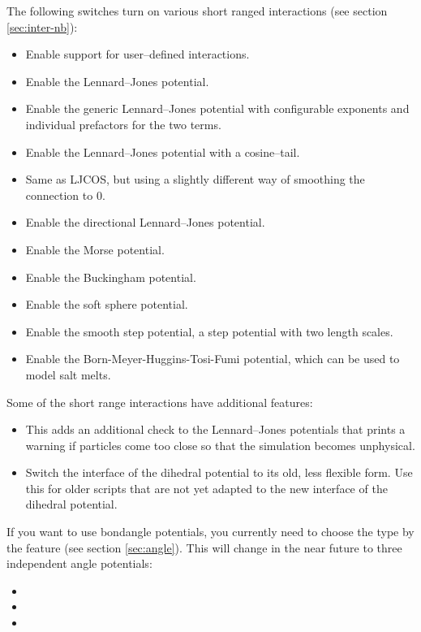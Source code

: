 The following switches turn on various short ranged interactions (see section
\vref{sec:inter-nb}):
\begin{itemize}
\item {} Enable support for user--defined
  interactions.
\item {} Enable the Lennard--Jones potential.
\item {} Enable the generic
  Lennard--Jones potential with configurable exponents and individual
  prefactors for the two terms.
\item {} Enable the Lennard--Jones potential with a cosine--tail.
\item {} Same as LJCOS, but using a slightly different way of
  smoothing the connection to 0.
\item {} Enable the directional Lennard--Jones potential.
\item {} Enable the Morse potential.
\item {} Enable the Buckingham potential.
\item {} Enable the soft sphere potential.
\item {} Enable the smooth step potential, a
  step potential with two length scales.
\item {} Enable the Born-Meyer-Huggins-Tosi-Fumi potential,
  which can be used to model salt melts.
\end{itemize}

Some of the short range interactions have additional features:
\begin{itemize}
\item {} This adds an additional check to
  the Lennard--Jones potentials that prints a warning if particles come
  too close so that the simulation becomes unphysical.
\item {} Switch the interface of the dihedral potential
  to its old, less flexible form. Use this for older scripts that are not yet
  adapted to the new interface of the dihedral potential.
\end{itemize}

If you want to use bondangle potentials, you currently need to choose
the type by the feature (see section \vref{sec:angle}). This will
change in the near future to three independent angle potentials:
\begin{itemize}
\item {}
\item {}
\item {}
\end{itemize}

